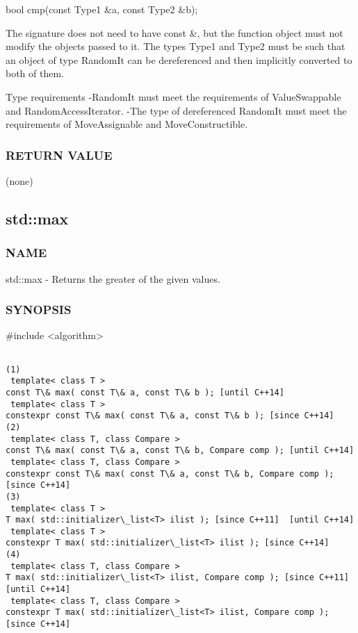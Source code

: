  bool cmp(const Type1 \&a, const Type2 \&b);

The signature does not need to have const \&, but the function object must not modify the objects passed to it.
The types Type1 and Type2 must be such that an object of type RandomIt can be dereferenced and then implicitly converted to both of them.

 Type requirements
 -RandomIt must meet the requirements of ValueSwappable and RandomAccessIterator.
 -The type of dereferenced RandomIt must meet the requirements of MoveAssignable and MoveConstructible.

\subsubsection{RETURN VALUE}
(none)



\subsection{std::max}

\subsubsection{NAME}
std::max - Returns the greater of the given values.

\subsubsection{SYNOPSIS}
\#include <algorithm>

\begin{lstlisting}

(1)
 template< class T >
const T\& max( const T\& a, const T\& b ); [until C++14]
 template< class T >
constexpr const T\& max( const T\& a, const T\& b ); [since C++14]
(2)
 template< class T, class Compare >
const T\& max( const T\& a, const T\& b, Compare comp ); [until C++14]
 template< class T, class Compare >
constexpr const T\& max( const T\& a, const T\& b, Compare comp ); [since C++14]
(3)
 template< class T >
T max( std::initializer\_list<T> ilist ); [since C++11]  [until C++14]
 template< class T >
constexpr T max( std::initializer\_list<T> ilist ); [since C++14]
(4)
 template< class T, class Compare >
T max( std::initializer\_list<T> ilist, Compare comp ); [since C++11]  [until C++14]
 template< class T, class Compare >
constexpr T max( std::initializer\_list<T> ilist, Compare comp ); [since C++14]
\end{lstlisting}


